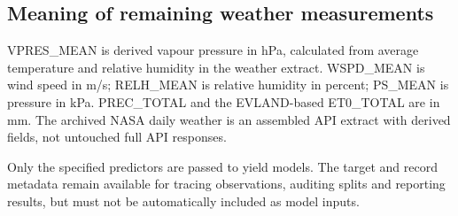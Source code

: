\documentclass[11pt,a4paper]{article}
\begin{document}
\subsection*{Meaning of remaining weather measurements}
VPRES\_MEAN is derived vapour pressure in hPa, calculated from average temperature and relative humidity in the weather extract. WSPD\_MEAN is wind speed in m/s; RELH\_MEAN is relative humidity in percent; PS\_MEAN is pressure in kPa. PREC\_TOTAL and the EVLAND-based ET0\_TOTAL are in mm. The archived NASA daily weather is an assembled API extract with derived fields, not untouched full API responses.

Only the specified predictors are passed to yield models. The target and record metadata remain available for tracing observations, auditing splits and reporting results, but must not be automatically included as model inputs.
\end{document}
